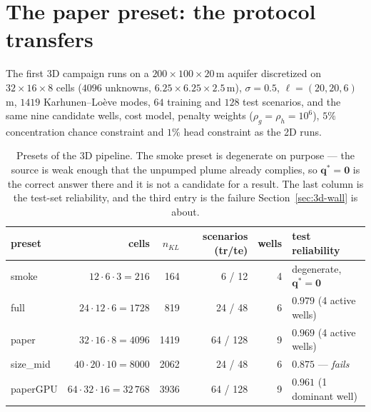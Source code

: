 \section{The paper preset: the protocol transfers}

The first 3D campaign runs on a $200\times100\times20$\,m aquifer discretized on
$32\times16\times8$ cells ($4096$ unknowns, $6.25\times6.25\times2.5$\,m),
$\sigma=0.5$, $\ell=(20,20,6)$\,m, $1419$ Karhunen--Lo\`eve modes, $64$ training
and $128$ test scenarios, and the same nine candidate wells, cost model, penalty
weights ($\rho_g=\rho_h=10^{6}$), $5\%$ concentration chance constraint and $1\%$
head constraint as the 2D runs.

\begin{table}[t]
  \centering
  \caption{Presets of the 3D pipeline. The smoke preset is degenerate on purpose
  --- the source is weak enough that the unpumped plume already complies, so
  $\mathbf{q}^*=\mathbf{0}$ is the correct answer there and it is not a
  candidate for a result. The last column is the test-set reliability, and the
  third entry is the failure Section~\ref{sec:3d-wall} is about.}
  \label{tab:3d-presets}
  \begin{tabular}{@{}lrrrrl@{}}
    \toprule
    preset & cells & $n_{KL}$ & scenarios (tr/te) & wells & test reliability \\
    \midrule
    smoke & $12\cdot6\cdot3=216$ & 164 & 6 / 12 & 4 & degenerate, $\mathbf{q}^*=\mathbf{0}$ \\
    full & $24\cdot12\cdot6=1728$ & 819 & 24 / 48 & 6 & $0.979$ (4 active wells) \\
    paper & $32\cdot16\cdot8=4096$ & 1419 & 64 / 128 & 9 & $0.969$ (4 active wells) \\
    size\_mid & $40\cdot20\cdot10=8000$ & 2062 & 24 / 48 & 6 & $0.875$ --- \emph{fails} \\
    paperGPU & $64\cdot32\cdot16=32\,768$ & 3936 & 64 / 128 & 9 & $0.961$ (1 dominant well) \\
    \bottomrule
  \end{tabular}
\end{table}

